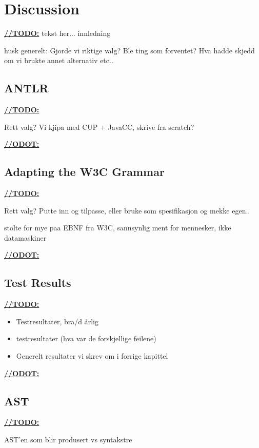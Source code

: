 \chapter{Discussion}
\underline{\textbf{\LARGE //TODO:}} tekst her... innledning


husk generelt: Gjorde vi riktige valg? Ble ting som forventet? Hva hadde skjedd om vi brukte annet alternativ etc..






\section{ANTLR}
\underline{\textbf{\LARGE //TODO:}}

Rett valg?
Vi kjipa med CUP + JavaCC, skrive fra scratch?

\underline{\textbf{\LARGE //ODOT:}}

\section{Adapting the W3C Grammar}
\underline{\textbf{\LARGE //TODO:}}

Rett valg? Putte inn og tilpasse, eller bruke som spesifikasjon og mekke egen..

stolte for mye paa EBNF fra W3C, sannsynlig ment for mennesker, ikke datamaskiner

\underline{\textbf{\LARGE //ODOT:}}


\section{Test Results}

\underline{\textbf{\LARGE //TODO:}}
\begin{itemize}
\item Testresultater, bra/d \aa rlig
\item testresultater (hva var de forskjellige feilene)
\item Generelt resultater vi skrev om i forrige kapittel
\end{itemize}

\underline{\textbf{\LARGE //ODOT:}}

\section{AST}
\underline{\textbf{\LARGE //TODO:}}

AST'en som blir produsert vs syntakstre

